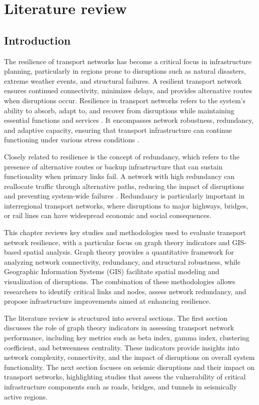 \chapter{Literature review}

\section{Introduction}
The resilience of transport networks has become a critical focus in infrastructure planning, particularly in regions prone to disruptions such as natural disasters, extreme weather events, and structural failures. A resilient transport network ensures continued connectivity, minimizes delays, and provides alternative routes when disruptions occur. Resilience in transport networks refers to the system's ability to absorb, adapt to, and recover from disruptions while maintaining essential functions and services \cite{holling1973}. It encompasses network robustness, redundancy, and adaptive capacity, ensuring that transport infrastructure can continue functioning under various stress conditions \cite{taylor2017}.

Closely related to resilience is the concept of redundancy, which refers to the presence of alternative routes or backup infrastructure that can sustain functionality when primary links fail. A network with high redundancy can reallocate traffic through alternative paths, reducing the impact of disruptions and preventing system-wide failures \cite{zhang2018}. Redundancy is particularly important in interregional transport networks, where disruptions to major highways, bridges, or rail lines can have widespread economic and social consequences.

This chapter reviews key studies and methodologies used to evaluate transport network resilience, with a particular focus on graph theory indicators and GIS-based spatial analysis. Graph theory provides a quantitative framework for analyzing network connectivity, redundancy, and structural robustness, while Geographic Information Systems (GIS) facilitate spatial modeling and visualization of disruptions. The combination of these methodologies allows researchers to identify critical links and nodes, assess network redundancy, and propose infrastructure improvements aimed at enhancing resilience.

The literature review is structured into several sections. The first section discusses the role of graph theory indicators in assessing transport network performance, including key metrics such as beta index, gamma index, clustering coefficient, and betweenness centrality. These indicators provide insights into network complexity, connectivity, and the impact of disruptions on overall system functionality. The next section focuses on seismic disruptions and their impact on transport networks, highlighting studies that assess the vulnerability of critical infrastructure components such as roads, bridges, and tunnels in seismically active regions.

